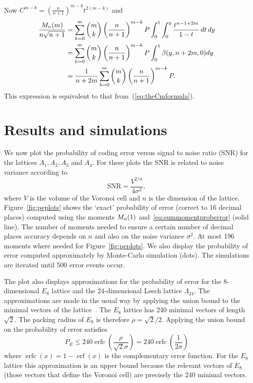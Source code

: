 \documentclass[draftcls, onecolumn, 11pt]{IEEEtran}
\begin{document}
Now $C^{m-k} = \left(\frac{n}{n+1} \right)^{m-k} t^{2(m-k)}$ and
\begin{align*}
\frac{M_n(m)}{n\sqrt{n+1}} &= \sum_{k=0}^{m} \binom{m}{k} \left(\frac{n}{n+1} \right)^{m-k} P \int_0^1 \int_0^y \frac{t^{n - 1 + 2m}}{1 - t} \, dt \, dy \\
&= \sum_{k=0}^{m} \binom{m}{k} \left(\frac{n}{n+1} \right)^{m-k} P \int_0^1 \beta(y,n+2m,0) dy \\
&= \frac{1}{n+2m} \sum_{k=0}^{m} \binom{m}{k} \left(\frac{n}{n+1} \right)^{m-k} P.
\end{align*}
This expression is equivalent to that from~(\ref{eq:theCmformula}).


\section{Results and simulations}\label{sec:results-simulations}

We now plot the probability of coding error versus signal to noise ratio (SNR) for the lattices $A_1, A_2, A_3$ and $A_4$.  For these plots the SNR is related to noise variance according to~\cite{Viterbo_diamond_cutting_1996}
\[
\text{SNR} = \frac{V^{2/n}}{4\sigma^2},
\]
where $V$ is the volume of the Voronoi cell and $n$ is the dimension of the lattice.  Figure~\ref{fig:peplots} shows the `exact' probability of error (correct to 16 decimal places) computed using the moments $M_n(1)$ and~\eqref{eq:summomentproberror} (solid line).  The number of moments needed to ensure a certain number of decimal places accuracy depends on $n$ and also on the noise variance $\sigma^2$.  At most 196 moments where needed for Figure~\ref{fig:peplots}.  We also display the probability of error computed approximately by Monte-Carlo simulation (dots).  %
The simulations are iterated until 500 error events occur.

The plot also displays approximations for the probability of error for the 8-dimensional $E_8$ lattice and the 24-dimensional Leech lattice $\Lambda_{24}$.  The approximations are made in the usual way by applying the union bound to the minimal vectors of the lattice~\cite[p.~71]{SPLAG}.  The $E_8$ lattice has 240 minimal vectors of length $\sqrt{2}$.  The packing radius of $E_8$ is therefore $\rho = \sqrt{2}/2$.  Applying the union bound on the  probability of error satisfies
\newcommand{\erfc}{\operatorname{erfc}}
\newcommand{\erf}{\operatorname{erf}}
\[
P_E \leq 240\erfc\left( \frac{\rho}{\sqrt{2}\sigma} \right) = 240\erfc\left(\frac{1}{2\sigma}\right)
\]
where $\erfc(x) = 1 - \erf(x)$ is the complementary error function.  For the $E_8$ lattice this approximation is an upper bound because the relevant vectors of $E_8$ (those vectors that define the Voronoi cell) are precisely the 240 minimal vectors.  %
\end{document}
